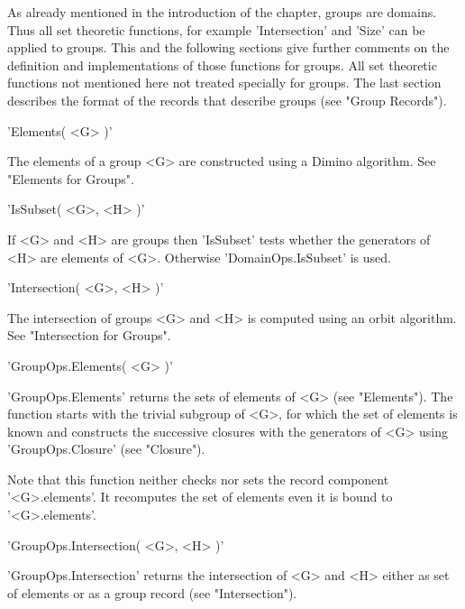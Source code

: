 
As already mentioned  in the  introduction  of  the  chapter,  groups are
domains.  Thus all  set  theoretic functions, for example  'Intersection'
and  'Size' can be applied  to groups.  This and the  following  sections
give  further comments on the  definition and  implementations  of  those
functions for groups.  All set theoretic functions not mentioned here not
treated specially for groups.  The last section describes the  format  of
the records that describe groups (see "Group Records").

\vspace{5mm}
'Elements( <G> )'%

The  elements of a  group  <G> are constructed  using a Dimino algorithm.
See "Elements for Groups".

\vspace{5mm}
'IsSubset( <G>, <H> )'%

If <G> and <H> are groups then 'IsSubset' tests whether the generators of
<H> are elements of <G>.  Otherwise 'DomainOps.IsSubset' is used.

\vspace{5mm}
'Intersection( <G>, <H> )'%

The intersection  of  groups  <G>  and  <H>  is  computed  using an orbit
algorithm.  See "Intersection for Groups".


'GroupOps.Elements( <G> )'

'GroupOps.Elements' returns the sets of elements of <G> (see "Elements").
The function starts  with the trivial subgroup of <G>,  for which the set
of elements  is  known and constructs the  successive  closures with  the
generators of <G> using 'GroupOps.Closure' (see "Closure").

Note that  this  function  neither checks nor  sets  the record component
'<G>.elements'.  It recomputes the  set of elements  even it is  bound to
'<G>.elements'.

\newpage
{}

'GroupOps.Intersection( <G>, <H> )'

'GroupOps.Intersection' returns the intersection of <G> and <H> either as
set of elements or as a group record (see "Intersection").

